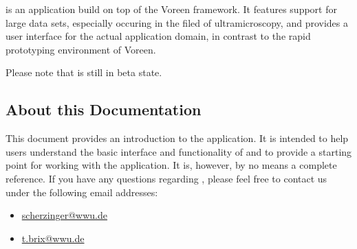 \Voreen is an application build on top of the Voreen framework. It features support for large data sets, especially
occuring in the filed of ultramicroscopy, and provides a user interface for the actual application domain,
in contrast to the rapid prototyping environment of Voreen.

Please note that \Voreen is still in beta state. 

\subsection{About this Documentation}

This document provides an introduction to the \Voreen application. It is intended to help users
understand the basic interface and functionality of \Voreen and to provide a starting point for working with the application.
It is, however, by no means a complete reference. If you have any questions regarding \Voreen, please feel free 
to contact us under the following email addresses:

\begin{itemize}
 \item \url{scherzinger@wwu.de}
 \item \url{t.brix@wwu.de}
\end{itemize}

\newpage 


